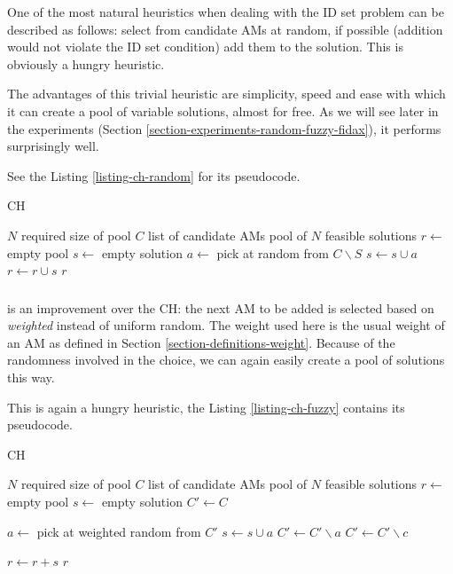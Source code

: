 One of the most natural heuristics when dealing with the ID set problem can be described as follows: select from candidate AMs at random, if possible (addition would not violate the ID set condition) add them to the solution. This is obviously a hungry heuristic.

The advantages of this trivial heuristic are simplicity, speed and ease with which it can create a pool of variable solutions, almost for free. As we will see later in the experiments (Section \ref{section-experiments-random-fuzzy-fidax}), it performs surprisingly well.

See the Listing \ref{listing-ch-random} for its pseudocode.

\begin{algorithm}
\caption{ CH}
\label{listing-ch-random}
\begin{algorithmic}
\REQUIRE $N$ required size of pool
\REQUIRE $C$ list of candidate AMs
\ENSURE pool of $N$ feasible solutions
\STATE $r \gets $ empty pool
  \STATE {}
  \STATE $s \gets $ empty solution
    \STATE $a \gets $ pick at random from $C \backslash S$
    \STATE $s \gets s \cup a$
  \ENDWHILE
  \STATE $r \gets r \cup s$
\ENDFOR
\RETURN $r$
\end{algorithmic}
\end{algorithm}

\subsubsection{}
\label{heu-ch-fuzzy}

 is an improvement over the  CH: the next AM to be added is selected based on \textit{weighted} instead of uniform random. The weight used here is the usual weight of an AM as defined in Section \ref{section-definitions-weight}. Because of the randomness involved in the choice, we can again easily create a pool of solutions this way.

This is again a hungry heuristic, the Listing \ref{listing-ch-fuzzy} contains its pseudocode.

\begin{algorithm}
\caption{ CH}
\label{listing-ch-fuzzy}
\begin{algorithmic}
\REQUIRE $N$ required size of pool
\REQUIRE $C$ list of candidate AMs
\ENSURE pool of $N$ feasible solutions
\STATE $r \gets $ empty pool
  \STATE {}
  \STATE $s \gets $ empty solution
  \STATE $C' \gets C$

    \STATE $a \gets $ pick at weighted random from $C'$
      \STATE $s \gets s \cup a$
      \STATE $C' \gets C' \backslash a$
    \ENDIF
        \STATE {}
        \STATE $C' \gets C' \backslash c$
      \ENDIF
    \ENDFOR
  \ENDWHILE

  \STATE $r \gets r + s$
\ENDFOR
\RETURN $r$
\end{algorithmic}
\end{algorithm}

